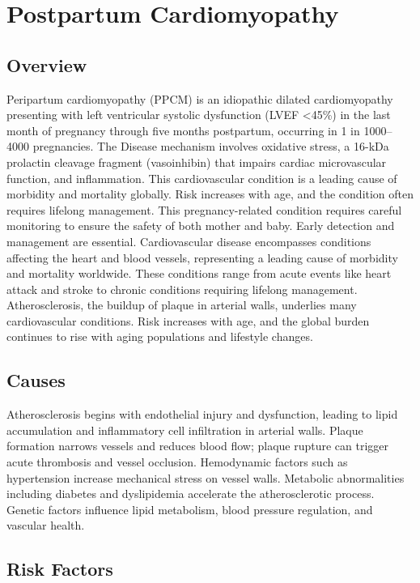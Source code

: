\chapter{Postpartum Cardiomyopathy}
\label{sec:Postpartum Cardiomyopathy}

\section{Overview}
Peripartum cardiomyopathy (PPCM) is an idiopathic dilated cardiomyopathy presenting with left ventricular systolic dysfunction (LVEF <45\%) in the last month of pregnancy through five months postpartum, occurring in 1 in 1000--4000 pregnancies. The Disease mechanism involves oxidative stress, a 16-kDa prolactin cleavage fragment (vasoinhibin) that impairs cardiac microvascular function, and inflammation. This cardiovascular condition is a leading cause of morbidity and mortality globally. Risk increases with age, and the condition often requires lifelong management. This pregnancy-related condition requires careful monitoring to ensure the safety of both mother and baby. Early detection and management are essential. Cardiovascular disease encompasses conditions affecting the heart and blood vessels, representing a leading cause of morbidity and mortality worldwide. These conditions range from acute events like heart attack and stroke to chronic conditions requiring lifelong management. Atherosclerosis, the buildup of plaque in arterial walls, underlies many cardiovascular conditions. Risk increases with age, and the global burden continues to rise with aging populations and lifestyle changes.
\section{Causes}
Atherosclerosis begins with endothelial injury and dysfunction, leading to lipid accumulation and inflammatory cell infiltration in arterial walls. Plaque formation narrows vessels and reduces blood flow; plaque rupture can trigger acute thrombosis and vessel occlusion. Hemodynamic factors such as hypertension increase mechanical stress on vessel walls. Metabolic abnormalities including diabetes and dyslipidemia accelerate the atherosclerotic process. Genetic factors influence lipid metabolism, blood pressure regulation, and vascular health.
\section{Risk Factors}

